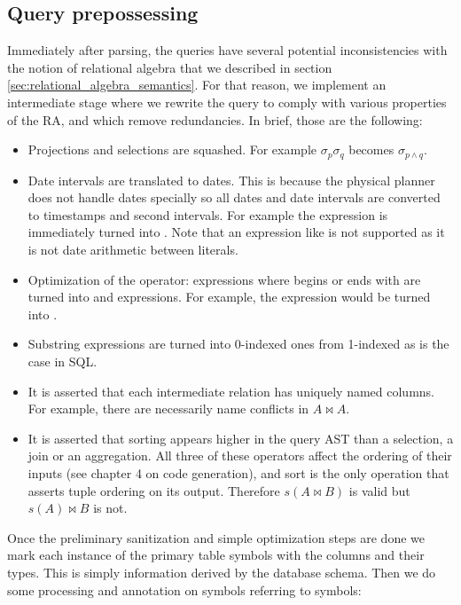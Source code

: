 \subsection{Query prepossessing}

Immediately after parsing, the queries have several potential
inconsistencies with the notion of relational algebra that we
described in section \ref{sec:relational_algebra_semantics}.
For that reason, we implement an intermediate stage
where we rewrite the query to comply with various properties of the
RA, and which remove redundancies. In brief, those are the following:

\begin{itemize}
\item Projections and selections are squashed. For example
  \(\sigma_p\sigma_q\) becomes \(\sigma_{p \land q}\).
\item Date intervals are translated to dates. This is because the
  physical planner does not handle dates specially so all dates and
  date intervals are converted to timestamps and second intervals. For
  example the expression  is
  immediately turned into . Note that an
  expression like  is not
  supported as it is not date arithmetic between literals.
\item Optimization of the  operator:  expressions where 
  begins or ends with \sql{\%} are turned into  and
   expressions. For example, the expression  would be turned into .
\item Substring expressions are turned into 0-indexed ones from
  1-indexed as is the case in SQL.
\item It is asserted that each intermediate relation has uniquely
  named columns. For example, there are necessarily name conflicts in
  \(A \Join A\).
\item It is asserted that sorting appears higher in the query AST than a
  selection, a join or an aggregation. All three of these operators
  affect the ordering of their inputs (see chapter 4 on code
  generation), and sort is the only operation that asserts tuple
  ordering on its output. Therefore \(s(A \Join B)\) is valid but
  \(s(A) \Join B\) is not.
\end{itemize}

Once the preliminary sanitization and simple optimization steps are
done we mark each instance of the primary table symbols with the
columns and their types. This is simply information derived by the
database schema. Then we do some processing and annotation on symbols
referring to symbols:

